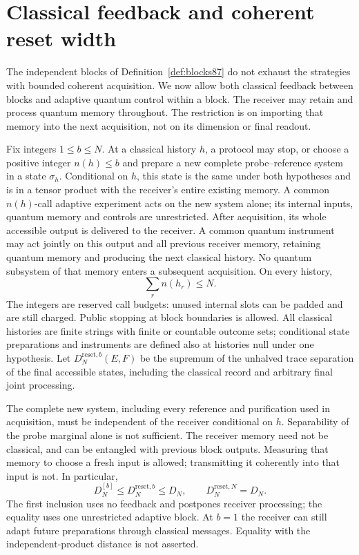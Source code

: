 \section{Classical feedback and coherent reset width}
\label{sec:reset88}
The independent blocks of Definition~\ref{def:blocks87} do not
exhaust the strategies with bounded coherent acquisition.  We now
allow both classical feedback between blocks and adaptive quantum
control within a block.  The receiver may retain and process quantum
memory throughout.  The restriction is on importing that memory
into the next acquisition, not on its dimension or final readout.

\begin{definition}\label{def:reset88}
Fix integers $1\le b\le N$.  At a classical history $h$, a protocol
may stop, or choose a positive integer $n(h)\le b$ and prepare a new
complete probe--reference system in a state $\sigma_h$.  Conditional
on $h$, this state is the same under both hypotheses and is in a
tensor product with the receiver's entire existing memory.  A common
$n(h)$-call adaptive experiment acts on the new system alone; its
internal inputs, quantum memory and controls are unrestricted.
After acquisition, its whole accessible output is delivered to the
receiver.  A common quantum instrument may act jointly on this
output and all previous receiver memory, retaining quantum memory
and producing the next classical history.  No quantum subsystem of
that memory enters a subsequent acquisition.  On every history,
\[
 \sum_r n(h_r)\le N.
\]
The integers are reserved call budgets: unused internal slots can
be padded and are still charged.  Public stopping at block boundaries
is allowed.  All classical histories are finite strings with finite
or countable outcome sets; conditional state preparations and
instruments are defined also at histories null under one hypothesis.
Let $D_N^{\mathrm{reset},b}(E,F)$ be the supremum of the unhalved
trace separation of the final accessible states, including the
classical record and arbitrary final joint processing.
\end{definition}

The complete new system, including every reference and purification
used in acquisition, must be independent of the receiver conditional
on $h$.  Separability of the probe marginal alone is not sufficient.
The receiver memory need not be classical, and can be entangled with
previous block outputs.  Measuring that memory to choose a fresh
input is allowed; transmitting it coherently into that input is not.
In particular,
\begin{equation}\label{eq:resetinclusions88}
 D_N^{[b]}\le D_N^{\mathrm{reset},b}\le D_N,
 \qquad D_N^{\mathrm{reset},N}=D_N.
\end{equation}
The first inclusion uses no feedback and postpones receiver processing;
the equality uses one unrestricted adaptive block.  At $b=1$ the
receiver can still adapt future preparations through classical
messages.  Equality with the independent-product distance is not
asserted.

